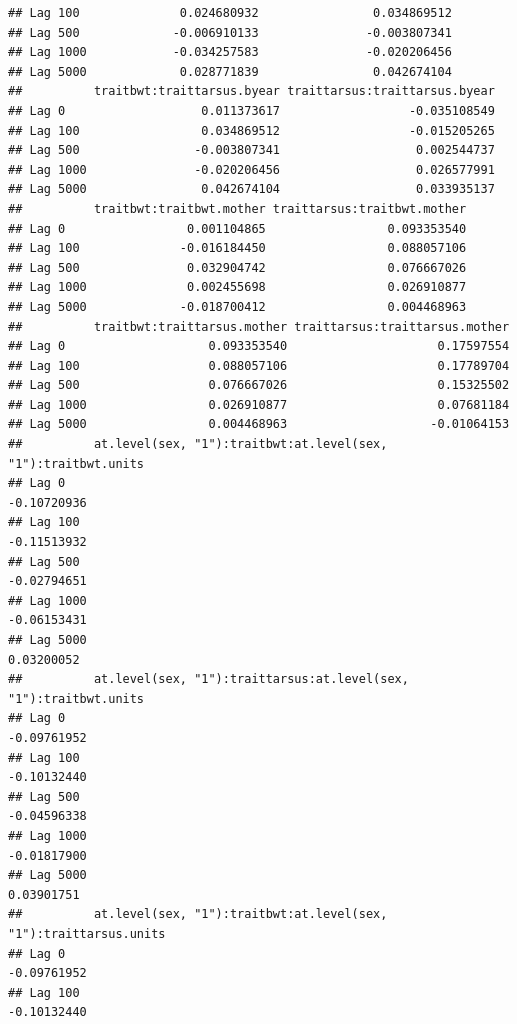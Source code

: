\documentclass[
  12pt,
]{book}
\begin{document}
\begin{verbatim}
## Lag 100              0.024680932                0.034869512
## Lag 500             -0.006910133               -0.003807341
## Lag 1000            -0.034257583               -0.020206456
## Lag 5000             0.028771839                0.042674104
##          traitbwt:traittarsus.byear traittarsus:traittarsus.byear
## Lag 0                   0.011373617                  -0.035108549
## Lag 100                 0.034869512                  -0.015205265
## Lag 500                -0.003807341                   0.002544737
## Lag 1000               -0.020206456                   0.026577991
## Lag 5000                0.042674104                   0.033935137
##          traitbwt:traitbwt.mother traittarsus:traitbwt.mother
## Lag 0                 0.001104865                 0.093353540
## Lag 100              -0.016184450                 0.088057106
## Lag 500               0.032904742                 0.076667026
## Lag 1000              0.002455698                 0.026910877
## Lag 5000             -0.018700412                 0.004468963
##          traitbwt:traittarsus.mother traittarsus:traittarsus.mother
## Lag 0                    0.093353540                     0.17597554
## Lag 100                  0.088057106                     0.17789704
## Lag 500                  0.076667026                     0.15325502
## Lag 1000                 0.026910877                     0.07681184
## Lag 5000                 0.004468963                    -0.01064153
##          at.level(sex, "1"):traitbwt:at.level(sex, "1"):traitbwt.units
## Lag 0                                                      -0.10720936
## Lag 100                                                    -0.11513932
## Lag 500                                                    -0.02794651
## Lag 1000                                                   -0.06153431
## Lag 5000                                                    0.03200052
##          at.level(sex, "1"):traittarsus:at.level(sex, "1"):traitbwt.units
## Lag 0                                                         -0.09761952
## Lag 100                                                       -0.10132440
## Lag 500                                                       -0.04596338
## Lag 1000                                                      -0.01817900
## Lag 5000                                                       0.03901751
##          at.level(sex, "1"):traitbwt:at.level(sex, "1"):traittarsus.units
## Lag 0                                                         -0.09761952
## Lag 100                                                       -0.10132440

\end{verbatim}
\end{document}
